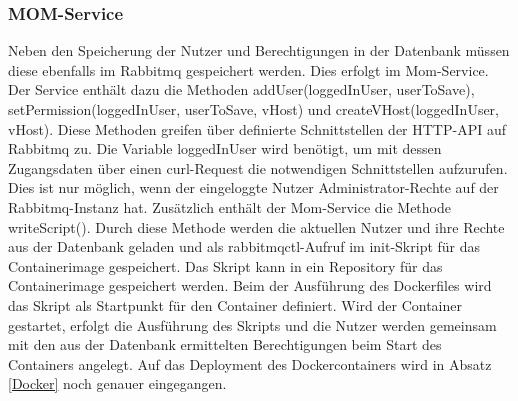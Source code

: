 \subsubsection{MOM-Service}
Neben den Speicherung der Nutzer und Berechtigungen in der Datenbank müssen diese ebenfalls im Rabbitmq gespeichert werden. Dies erfolgt im Mom-Service. Der Service enthält dazu die Methoden addUser(loggedInUser, userToSave), setPermission(loggedInUser, userToSave, vHost) und createVHost(loggedInUser, vHost). Diese Methoden greifen über definierte Schnittstellen der HTTP-API auf Rabbitmq zu. Die Variable loggedInUser wird benötigt, um mit dessen Zugangsdaten über einen curl-Request die notwendigen Schnittstellen aufzurufen. Dies ist nur möglich, wenn der eingeloggte Nutzer Administrator-Rechte auf der Rabbitmq-Instanz hat. Zusätzlich enthält der Mom-Service die Methode writeScript(). Durch diese Methode werden die aktuellen Nutzer und ihre Rechte aus der Datenbank geladen und als rabbitmqctl-Aufruf im init-Skript für das Containerimage gespeichert. Das Skript kann in ein Repository für das Containerimage gespeichert werden. Beim der Ausführung des Dockerfiles  wird das Skript als Startpunkt für den Container definiert. Wird der Container gestartet, erfolgt die Ausführung des Skripts und die Nutzer werden gemeinsam mit den aus der Datenbank ermittelten Berechtigungen beim Start des Containers angelegt. Auf das Deployment des Dockercontainers wird in Absatz \ref{Docker} noch genauer eingegangen.







